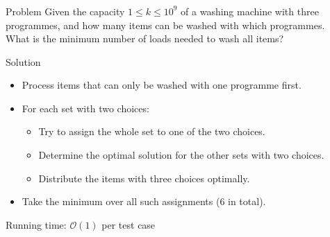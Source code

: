 \begin{frame}[t]\frametitle{\problemtitle}
    \begin{block}{Problem}
        Given the capacity $1 \leq k \leq 10^9$ of a washing machine with three programmes, and how many items can be washed with which programmes.\\
      What is the minimum number of loads needed to wash all items? 
  \end{block}
  \vspace*{0.3cm}
    \begin{block}{Solution}
        \begin{itemize}
            \item<+-> Process items that can only be washed with one programme first. 
            \item<+-> For each set with two choices: 
            \begin{itemize}
                \item<+-> Try to assign the whole set to one of the two choices.
                \item<+-> Determine the optimal solution for the other sets with two choices. 
                \item<+-> Distribute the items with three choices optimally.
            \end{itemize}
            \item<+-> Take the minimum over all such assignments ($6$ in total). 
        \end{itemize}
        \pause 
        Running time: $\mathcal{O}(1)$ per test case
    \end{block}


\end{frame}